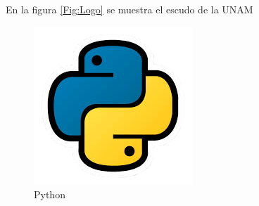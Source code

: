 \documentclass{article}
\begin{document}
En la figura \ref{Fig:Logo} se muestra el escudo de la UNAM
	\newpage
	\begin{figure}
		\centering
		\includegraphics[scale=0.5]{img/python}
		\caption{Python}
	\end{figure}
	\lipsum
	
\end{document}
